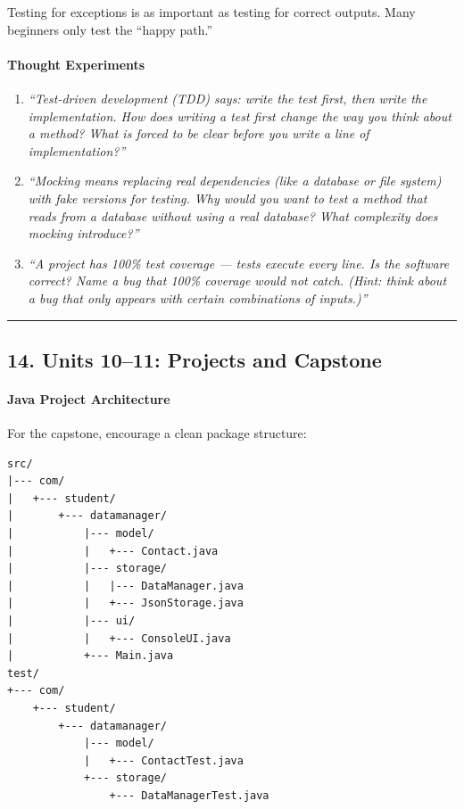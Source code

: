 \documentclass[
  justified,
  openright,
]{tufte-book}
\let\subsubsection\paragraph
\let\paragraph\paragraph
\let\subsubsection\paragraph
\let\paragraph\paragraph
\begin{document}
Testing for exceptions is as important as testing for correct outputs.
Many beginners only test the ``happy path.''

\paragraph{Thought Experiments}\label{thought-experiments-11}

\begin{enumerate}
\def\labelenumi{\arabic{enumi}.}
\item
  \emph{``Test-driven development (TDD) says: write the test first, then
  write the implementation. How does writing a test first change the way
  you think about a method? What is forced to be clear before you write
  a line of implementation?''}
\item
  \emph{``Mocking means replacing real dependencies (like a database or
  file system) with fake versions for testing. Why would you want to
  test a method that reads from a database without using a real
  database? What complexity does mocking introduce?''}
\item
  \emph{``A project has 100\% test coverage --- tests execute every
  line. Is the software correct? Name a bug that 100\% coverage would
  not catch. (Hint: think about a bug that only appears with certain
  combinations of inputs.)''}
\end{enumerate}

\begin{center}\rule{0.5\linewidth}{0.5pt}\end{center}

\subsection{14. Units 10--11: Projects and
Capstone}\label{units-1011-projects-and-capstone}

\subsubsection{Java Project
Architecture}\label{java-project-architecture}

For the capstone, encourage a clean package structure:

\begin{verbatim}
src/
|--- com/
|   +--- student/
|       +--- datamanager/
|           |--- model/
|           |   +--- Contact.java
|           |--- storage/
|           |   |--- DataManager.java
|           |   +--- JsonStorage.java
|           |--- ui/
|           |   +--- ConsoleUI.java
|           +--- Main.java
test/
+--- com/
    +--- student/
        +--- datamanager/
            |--- model/
            |   +--- ContactTest.java
            +--- storage/
                +--- DataManagerTest.java
\end{verbatim}
\end{document}
